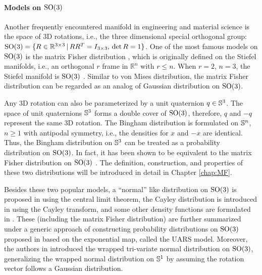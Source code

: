 \paragraph{Models on $\mathrm{SO}(3)$}

Another frequently encountered manifold in engineering and material science is the space of 3D rotations, i.e., the three dimensional special orthogonal group: $\mathrm{SO}(3) = \{ R\in\mathbb{R}^{3\times 3} \,|\, RR^T = I_{3\times 3}, \, \det R = 1\}$.
One of the most famous models on $\mathrm{SO}(3)$ is the matrix Fisher distribution \cite{downs1972orientation,khatri1977mises}, which is originally defined on the Stiefel manifolds, i.e., an orthogonal $r$ frame in $\mathbb{R}^n$ with $r\leq n$.
When $r=2$, $n=3$, the Stiefel manifold is $\mathrm{SO}(3)$ \cite[Chapter 13.2.1]{mardia2009directional}.
Similar to von Mises distribution, the matrix Fisher distribution can be regarded as an analog of Gaussian distribution on $\mathrm{SO}(3)$.

Any 3D rotation can also be parameterized by a unit quaternion $q\in\mathbb{S}^3$.
The space of unit quaternions $\mathbb{S}^3$ forms a double cover of $\mathrm{SO}(3)$, therefore, $q$ and $-q$ represent the same 3D rotation.
The Bingham distribution \cite{bingham1974antipodally} is formulated on $\mathbb{S}^n$, $n\geq 1$ with antipodal symmetry, i.e., the densities for $x$ and $-x$ are identical.
Thus, the Bingham distribution on $\mathbb{S}^3$ can be treated as a probability distribution on $\mathrm{SO}(3)$.
In fact, it has been shown to be equivalent to the matrix Fisher distribution on $\mathrm{SO}(3)$ \cite{prentice1986orientation}.
The definition, construction, and properties of these two distributions will be introduced in detail in Chapter \ref{chap:MF}.

Besides these two popular models, a ``normal'' like distribution on $\mathrm{SO}(3)$ is proposed in \cite{nikolayev1997normal} using the central limit theorem,
the Cayley distribution is introduced in \cite{leon2006statistical} using the Cayley transform,
and some other density functions are formulated in \cite{bunge2013texture,matthies1982form}.
These (including the matrix Fisher distribution) are further summarized under a generic approach of constructing probability distributions on $\mathrm{SO}(3)$ proposed in \cite{qiu2014wrapped} based on the exponential map, called the UARS model.
Moreover, the authors in \cite{qiu2014wrapped} introduced the wrapped tri-variate normal distribution on $\mathrm{SO}(3)$, generalizing the wrapped normal distribution on $\mathbb{S}^1$ by assuming the rotation vector follows a Gaussian distribution.

